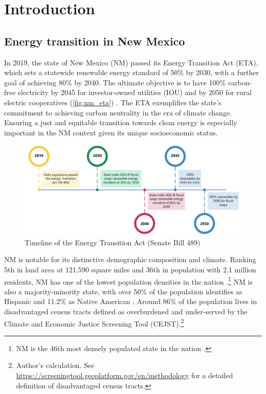 \documentclass[11pt,twoside,letterpaper]{article}
\begin{document}
\newpage



\tableofcontents
\listoffigures
\listoftables
\newpage

\section{Introduction}

\subsection{Energy transition in New Mexico}


In 2019, the state of New Mexico (NM) passed its Energy Transition Act (ETA), which sets a statewide renewable energy standard of 50\% by 2030, with a further goal of achieving 80\% by 2040. The ultimate objective is to have 100\% carbon-free electricity by 2045 for investor-owned utilities (IOU) and by 2050 for rural electric cooperatives (\autoref{fig:nm_eta}) \parencite{nmleg2019}. The ETA exemplifies the state's commitment to achieving carbon neutrality in the era of climate change. Ensuring a just and equitable transition towards clean energy is especially important in the NM context given its unique socioeconomic status.

\begin{figure}[!ht]
    \centering
    \includegraphics[width=1\textwidth]{figures/nm_eta.png}
    \caption{Timeline of the Energy Transition Act (Senate Bill 489)}
    \label{fig:nm_eta}
\end{figure}

NM is notable for its distinctive demographic composition and climate. Ranking 5th in land area at 121,590 square miles and 36th in population with 2.1 million residents, NM has one of the lowest population densities in the nation \parencite{uscensus2022}.\footnote{NM is the 46th most densely populated state in the nation \parencite{uscensus2022}.} NM is also a majority-minority state, with over 50\% of the population identifies as Hispanic and 11.2\% as Native American \parencite{uscensus2020}.  Around 86\% of the population lives in disadvantaged census tracts defined as overburdened and under-served by the Climate and Economic Justice Screening Tool (CEJST).\footnote{Author's calculation. See \url{https://screeningtool.geoplatform.gov/en/methodology} for a detailed definition of disadvantaged census tracts.} 
\end{document}
